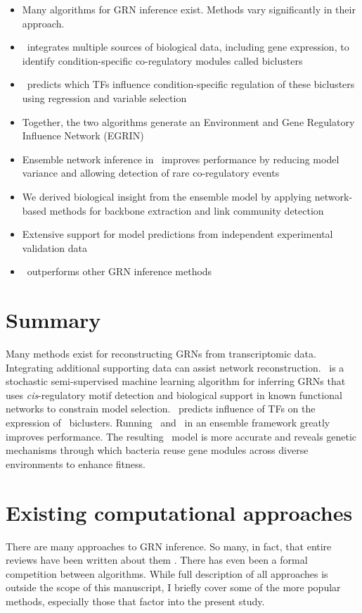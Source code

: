 	\begin{itemize}
	\item Many algorithms for GRN inference exist. Methods vary significantly in their approach. 
	\item \cm\ integrates multiple sources of biological data, including gene expression, to identify condition-specific co-regulatory modules called biclusters
	\item \nwinf\ predicts which TFs influence condition-specific regulation of these biclusters using regression and variable selection
	\item Together, the two algorithms generate an Environment and Gene Regulatory Influence Network (EGRIN)
	\item Ensemble network inference in \egrine\ improves performance by reducing model variance and allowing detection of rare co-regulatory events 
	\item We derived biological insight from the ensemble model by applying network-based methods for backbone extraction and link community detection
	\item Extensive support for model predictions from independent experimental validation data
	\item \egrine~outperforms other GRN inference methods 
	\end{itemize}

\section{Summary}

Many methods exist for reconstructing GRNs from transcriptomic data. Integrating additional supporting data can assist network reconstruction. \cm\ is a stochastic semi-supervised machine learning algorithm for inferring GRNs that uses \textit{cis}-regulatory motif detection and biological support in known functional networks to constrain model selection. \nwinf~predicts influence of TFs on the expression of \cm~biclusters. Running \cm\ and \nwinf~in an ensemble framework greatly improves performance. The resulting \egrine\ model is more accurate and reveals genetic mechanisms through which bacteria reuse gene modules across diverse environments to enhance fitness.  

\section{Existing computational approaches}

There are many approaches to GRN inference. So many, in fact, that entire reviews have been written about them \cite{bansal_how_2007,de_smet_advantages_2010}. There has even been a formal competition between algorithms. While full description of all approaches is outside the scope of this manuscript, I briefly cover some of the more popular methods, especially those that factor into the present study. 

